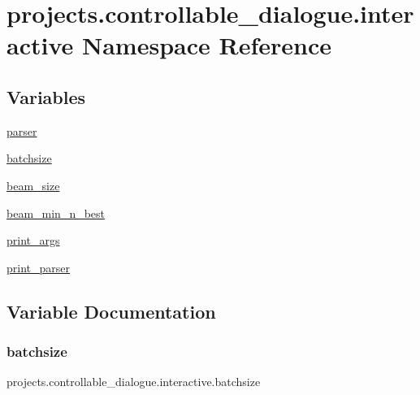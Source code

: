 \hypertarget{namespaceprojects_1_1controllable__dialogue_1_1interactive}{}\section{projects.\+controllable\+\_\+dialogue.\+interactive Namespace Reference}
\label{namespaceprojects_1_1controllable__dialogue_1_1interactive}
\subsection*{Variables}
\begin{DoxyCompactItemize}
\item 
\hyperlink{namespaceprojects_1_1controllable__dialogue_1_1interactive_afe1a4872b1de35e52af71e5f090a0046}{parser}
\item 
\hyperlink{namespaceprojects_1_1controllable__dialogue_1_1interactive_a28b16537759180e8ce8df2cb1ed0b8d2}{batchsize}
\item 
\hyperlink{namespaceprojects_1_1controllable__dialogue_1_1interactive_a68998be1e061b709e2eee7616aaf5cbc}{beam\+\_\+size}
\item 
\hyperlink{namespaceprojects_1_1controllable__dialogue_1_1interactive_a6242c6afeaa8e797ca8162736039d4b9}{beam\+\_\+min\+\_\+n\+\_\+best}
\item 
\hyperlink{namespaceprojects_1_1controllable__dialogue_1_1interactive_a848ec37290d8d5437d6c2296cf5370ad}{print\+\_\+args}
\item 
\hyperlink{namespaceprojects_1_1controllable__dialogue_1_1interactive_a0e7164399f15c542699dd4048b32aec6}{print\+\_\+parser}
\end{DoxyCompactItemize}


\subsection{Variable Documentation}
\mbox{\label{namespaceprojects_1_1controllable__dialogue_1_1interactive_a28b16537759180e8ce8df2cb1ed0b8d2}} 
\subsubsection{\texorpdfstring{batchsize}{batchsize}}
{\footnotesize\ttfamily projects.\+controllable\+\_\+dialogue.\+interactive.\+batchsize}



